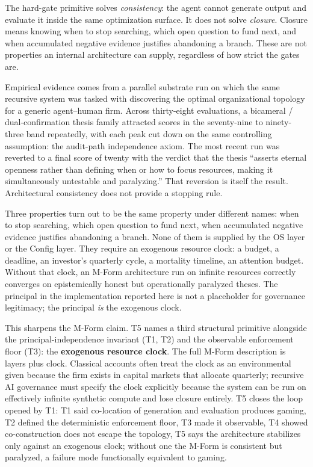 \documentclass[11pt]{article}
\begin{document}
The hard-gate primitive solves \emph{consistency}: the agent cannot generate output and evaluate it inside the same optimization surface. It does not solve \emph{closure}. Closure means knowing when to stop searching, which open question to fund next, and when accumulated negative evidence justifies abandoning a branch. These are not properties an internal architecture can supply, regardless of how strict the gates are.

Empirical evidence comes from a parallel substrate run on which the same recursive system was tasked with discovering the optimal organizational topology for a generic agent--human firm. Across thirty-eight evaluations, a bicameral / dual-confirmation thesis family attracted scores in the seventy-nine to ninety-three band repeatedly, with each peak cut down on the same controlling assumption: the audit-path independence axiom. The most recent run was reverted to a final score of twenty with the verdict that the thesis ``asserts eternal openness rather than defining when or how to focus resources, making it simultaneously untestable and paralyzing.'' That reversion is itself the result. Architectural consistency does not provide a stopping rule.

Three properties turn out to be the same property under different names: when to stop searching, which open question to fund next, when accumulated negative evidence justifies abandoning a branch. None of them is supplied by the OS layer or the Config layer. They require an exogenous resource clock: a budget, a deadline, an investor's quarterly cycle, a mortality timeline, an attention budget. Without that clock, an M-Form architecture run on infinite resources correctly converges on epistemically honest but operationally paralyzed theses. The principal in the implementation reported here is not a placeholder for governance legitimacy; the principal \emph{is} the exogenous clock.

This sharpens the M-Form claim. T5 names a third structural primitive alongside the principal-independence invariant (T1, T2) and the observable enforcement floor (T3): the \textbf{exogenous resource clock}. The full M-Form description is layers plus clock. Classical accounts often treat the clock as an environmental given because the firm exists in capital markets that allocate quarterly; recursive AI governance must specify the clock explicitly because the system can be run on effectively infinite synthetic compute and lose closure entirely. T5 closes the loop opened by T1: T1 said co-location of generation and evaluation produces gaming, T2 defined the deterministic enforcement floor, T3 made it observable, T4 showed co-construction does not escape the topology, T5 says the architecture stabilizes only against an exogenous clock; without one the M-Form is consistent but paralyzed, a failure mode functionally equivalent to gaming.
\end{document}
